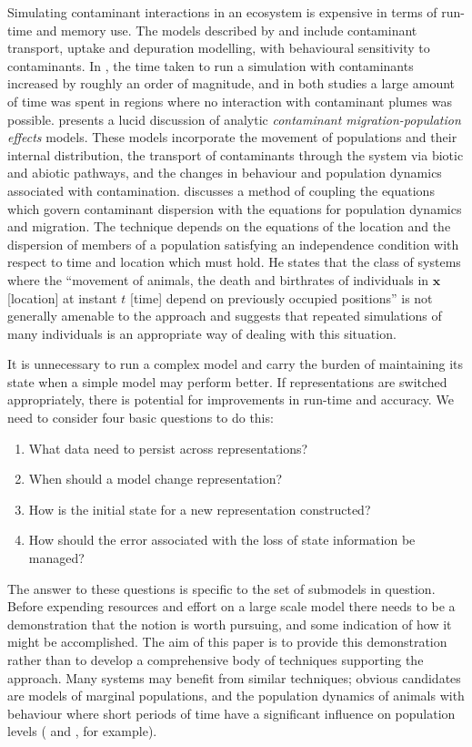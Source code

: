 Simulating contaminant interactions in an ecosystem is expensive in terms of
run-time and memory use. The models described by \citeauthor{Gray06:1} and
\citeauthor{Lyne94:1} include contaminant transport, uptake and depuration
modelling, with behavioural sensitivity to contaminants. In \citeauthor{Gray06:1},
the time taken to run a simulation with contaminants increased by roughly an
order of magnitude, and in both studies a large amount of time was spent in
regions where no interaction with contaminant plumes was possible.
\citet{Monte09:1} presents a lucid discussion of analytic {\em{contaminant
migration-population effects}} models. These models incorporate the movement
of populations and their internal distribution, the transport of contaminants
through the system via biotic and abiotic pathways, and the changes in
behaviour and population dynamics associated with contamination.
 discusses a method of coupling the equations which govern
contaminant dispersion with the equations for population dynamics and
migration. The technique depends on the equations of the location and the
dispersion of members of a population satisfying an independence condition
with respect to time and location which must hold. He states that the class of
systems where the ``movement of animals, the death and birthrates of
individuals in $\mathbf{x}$ [location] at instant $t$ [time] depend on
previously occupied positions'' is not generally amenable to the approach and
suggests that repeated simulations of many individuals is an appropriate way
of dealing with this situation.

It is unnecessary to run a complex model and carry the burden of maintaining
its state when a simple model may perform better. If representations are
switched appropriately, there is potential for improvements in run-time and
accuracy. We need to consider four basic questions to do this:
\begin{enumerate}
  \item What data need to persist across representations?\label{Q1}
  
  \item When should a model change representation?\label{Q2}
  
  \item How is the initial state for a new representation
  constructed?\label{Q3}
  
  \item How should the error associated with the loss of state information be
  managed?\label{Q4}
\end{enumerate}
The answer to these questions is specific to the set of submodels in question.
Before expending resources and effort on a large scale model there needs to be
a demonstration that the notion is worth pursuing, and some indication of how
it might be accomplished. The aim of this paper is to provide this
demonstration rather than to develop a comprehensive body of techniques
supporting the approach. Many systems may benefit from similar techniques;
obvious candidates are models of marginal populations, and the population
dynamics of animals with behaviour where short periods of time have a
significant influence on population levels (\citet{Wolff94:1} and
\citet{Elderd08:1}, for example).

